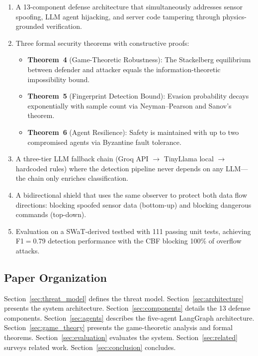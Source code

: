 \documentclass[journal]{IEEEtran}
\begin{document}
\begin{enumerate}[leftmargin=*]
\item A 13-component defense architecture that simultaneously addresses sensor spoofing, LLM agent hijacking, and server code tampering through physics-grounded verification.

\item Three formal security theorems with constructive proofs:
  \begin{itemize}
    \item \textbf{Theorem~4} (Game-Theoretic Robustness): The Stackelberg equilibrium between defender and attacker equals the information-theoretic impossibility bound.
    \item \textbf{Theorem~5} (Fingerprint Detection Bound): Evasion probability decays exponentially with sample count via Neyman--Pearson and Sanov's theorem.
    \item \textbf{Theorem~6} (Agent Resilience): Safety is maintained with up to two compromised agents via Byzantine fault tolerance.
  \end{itemize}

\item A three-tier LLM fallback chain (Groq API $\to$ TinyLlama local $\to$ hardcoded rules) where the detection pipeline never depends on any LLM---the chain only enriches classification.

\item A bidirectional shield that uses the same observer to protect both data flow directions: blocking spoofed sensor data (bottom-up) and blocking dangerous commands (top-down).

\item Evaluation on a SWaT-derived testbed with 111 passing unit tests, achieving F1$=$0.79 detection performance with the CBF blocking 100\% of overflow attacks.
\end{enumerate}

\subsection{Paper Organization}
Section~\ref{sec:threat_model} defines the threat model. Section~\ref{sec:architecture} presents the system architecture. Section~\ref{sec:components} details the 13 defense components. Section~\ref{sec:agents} describes the five-agent LangGraph architecture. Section~\ref{sec:game_theory} presents the game-theoretic analysis and formal theorems. Section~\ref{sec:evaluation} evaluates the system. Section~\ref{sec:related} surveys related work. Section~\ref{sec:conclusion} concludes.
\end{document}
